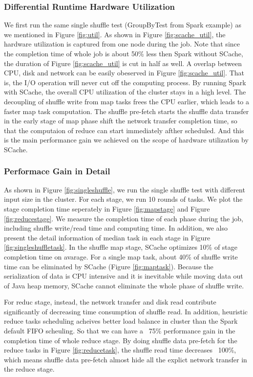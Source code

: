 \subsubsection{Differential Runtime Hardware Utilization} 
We first run the same single shuffle test (GroupByTest from Spark example\cite{sparksource}) as we mentioned in Figure \ref{fig:util}. As shown in Figure \ref{fig:scache_util}, the hardware utilization is captured from one node during the job. Note that since the completion time of whole job is about 50\% less then Spark without SCache, the duration of Figure \ref{fig:scache_util} is cut in half as well. A overlap between CPU, disk and network can be easily obeserved in Figure \ref{fig:scache_util}. That is, the I/O operation will never cut off the computing process. By running Spark with SCache, the overall CPU utilization of the cluster stays in a high level. The decoupling of shuffle write from map tasks frees the CPU earlier, which leads to a faster map task computation. The shuffle pre-fetch starts the shuffle data transfer in the early stage of map phase shift the network transfer completion time, so that the computaion of reduce can start immediately afther scheduled. And this is the main performance gain we achieved on the scope of hardware utilization by SCache.

\subsubsection{Performace Gain in Detail}

As shown in Figure \ref{fig:singleshuffle}, we run the single shuffle test with different input size in the cluster. For each stage, we run 10 rounds of tasks. We plot the stage completion time seperately in Figure \ref{fig:mapstage} and Figure \ref{fig:reducestage}. We measure the completion time of each phase during the job, including shuffle write/read time and computing time. In addition, we also present the detail information of median task in each stage in Figure \ref{fig:singleshuffletask}. In the shuffle map stage, SCache optimizes 10\% of stage completion time on avarage. For a single map task, about 40\% of shuffle write time can be eliminated by SCache (Figure \ref{fig:maptask}). Because the serialization of data is CPU intensive\cite{makingsense} and it is inevitable while moving data out of Java heap memory, SCache cannot eliminate the whole phase of shuffle write. 

For reduc stage, instead, the network transfer and disk read contribute significantly of decreasing time consumption of shuffle read. In addition, heuristic reduce tasks scheduling acheives better load balance in cluster than the Spark default FIFO scheuling. So that we can have a ~75\% performance gain in the completion time of whole reduce stage. By doing shuffle data pre-fetch for the reduce tasks in Figure \ref{fig:reducetask}, the shuffle read time decreases ~100\%, which means shuffle data pre-fetch almost hide all the explict network transfer in the reduce stage.

